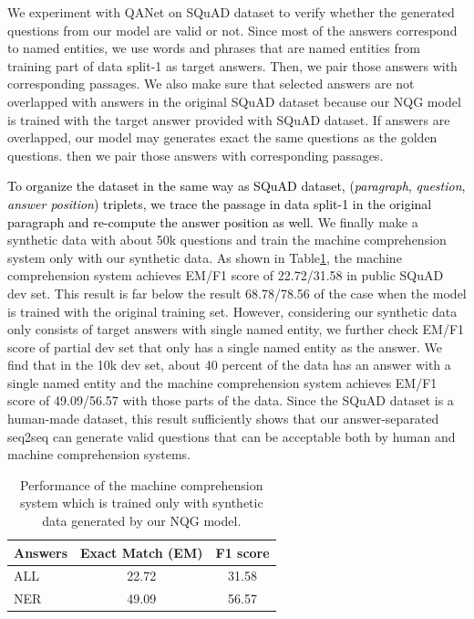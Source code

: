 \documentclass[letterpaper]{article} %
\newcommand\Tstrut{\rule{0pt}{2.3ex}}         %
\newcommand{\hh}[1]{\textcolor{black}{#1}}
\begin{document}
We experiment with QANet \cite{yu2018qanet} on SQuAD dataset to verify whether the generated questions from our model are valid or not. Since most of the answers correspond to named entities, we use words and phrases that are named entities from training part of data split-1 as target answers. Then, we pair those answers with corresponding passages. We also make sure that selected answers are not overlapped with answers in the original SQuAD dataset because our NQG model is trained with the target answer provided with SQuAD dataset. If answers are overlapped, our model may generates exact the same questions as the golden questions. then we pair those answers with corresponding passages.

\hh{To organize the dataset in the same way as SQuAD dataset, (\textit{paragraph}, \textit{question}, \textit{answer position}) triplets, we trace the passage in data split-1 in the original paragraph and re-compute the answer position as well.} We finally make a synthetic data with about 50k questions and train the machine comprehension system only with our synthetic data.
As shown in Table\ref{table:qa}, the machine comprehension system achieves EM/F1 score of 22.72/31.58 in public SQuAD dev set. This result is far below the result 68.78/78.56 of the case when the model is trained with the original training set. However, considering our synthetic data only consists of target answers with single named entity, we further check EM/F1 score of partial dev set that only has a single named entity as the answer. We find that in the 10k dev set, about 40 percent of the data has an answer with a single named entity and the machine comprehension system achieves EM/F1 score of 49.09/56.57 with those parts of the data. Since the SQuAD dataset is a human-made dataset, this result sufficiently shows that our answer-separated seq2seq can generate valid questions that can be acceptable both by human and machine comprehension systems.


\begin{table}[!t]
\centering
\begin{tabular}{|l|c|c|}
\hline
Answers & Exact Match (EM)      & F1 score\Tstrut      \\ \hline
ALL     & 22.72       & 31.58\Tstrut       \\ \hline
NER     & 49.09 & 56.57\Tstrut \\ \hline
\end{tabular}%
\vspace{-0.72mm}
\caption{Performance of the machine comprehension system which is trained only with synthetic data generated by our NQG model.}
\label{table:qa}
\end{table}
\end{document}
